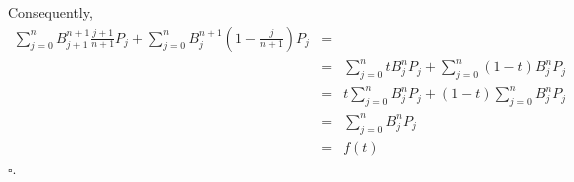 \documentclass[12pt]{article}
\begin{document}
Consequently,
\begin{eqnarray*}
\sum_{j=0}^{n} B_{j+1}^{n+1}\frac{j+1}{n+1}P_{j} +\sum_{j=0}^{n} B_j^{n+1} \left(1 - \frac{j}{n+1}\right)P_{j} &=& \\
&=& \sum_{j=0}^{n} tB_j^{n}P_{j} +\sum_{j=0}^{n}(1- t)B_j^{n} P_{j} \\
&=& t\sum_{j=0}^{n} B_j^{n}P_{j} + (1- t)\sum_{j=0}^{n}B_j^{n} P_{j} \\
&=& \sum_{j=0}^{n} B_j^{n}P_{j} \\
& =& f(t)
\end{eqnarray*}
\hfill$\square$.
\end{document}
